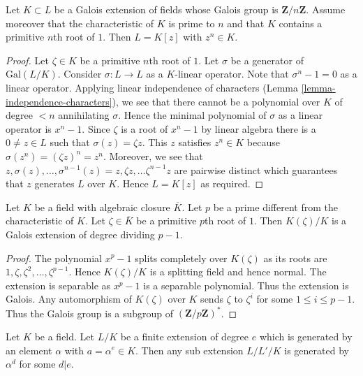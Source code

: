 \begin{lemma}
\label{lemma-Kummer}
Let $K \subset L$ be a Galois extension of fields whose Galois group is
$\mathbf{Z}/n\mathbf{Z}$. Assume moreover that the characteristic of $K$
is prime to $n$ and that $K$ contains a primitive $n$th root of $1$.
Then $L = K[z]$ with $z^n \in K$.
\end{lemma}

\begin{proof}
Let $\zeta \in K$ be a primitive $n$th root of $1$.
Let $\sigma$ be a generator of $\text{Gal}(L/K)$.
Consider $\sigma : L \to L$ as a $K$-linear operator.
Note that $\sigma^n - 1 = 0$ as a linear operator.
Applying linear independence of characters
(Lemma \ref{lemma-independence-characters}), we see
that there cannot be a polynomial over $K$ of degree $< n$
annihilating $\sigma$. Hence the minimal polynomial of $\sigma$
as a linear operator is $x^n - 1$. 
Since $\zeta$ is a root of $x^n - 1$ by linear algebra
there is a $0 \neq z \in L$ such that $\sigma(z) = \zeta z$.
This $z$ satisfies $z^n \in K$ because
$\sigma(z^n) = (\zeta z)^n = z^n$. Moreover, we see that
$z, \sigma(z), \ldots, \sigma^{n - 1}(z) =
z, \zeta z, \ldots \zeta^{n - 1} z$ are pairwise distinct
which guarantees that $z$ generates $L$ over $K$.
Hence $L = K[z]$ as required.
\end{proof}

\begin{lemma}
\label{lemma-adjoint-pth-root-unity}
Let $K$ be a field with algebraic closure $\overline{K}$.
Let $p$ be a prime different from the characteristic of $K$.
Let $\zeta \in \overline{K}$ be a primitive $p$th root
of $1$. Then $K(\zeta)/K$ is a Galois extension of degree dividing $p - 1$.
\end{lemma}

\begin{proof}
The polynomial $x^p - 1$ splits completely over
$K(\zeta)$ as its roots are $1, \zeta, \zeta^2, \ldots, \zeta^{p - 1}$.
Hence $K(\zeta)/K$ is a splitting field and hence normal.
The extension is separable as $x^p - 1$ is a separable polynomial.
Thus the extension is Galois. Any automorphism of $K(\zeta)$ over $K$
sends $\zeta$ to $\zeta^i$ for some $1 \leq i \leq p - 1$.
Thus the Galois group is a subgroup of $(\mathbf{Z}/p\mathbf{Z})^*$.
\end{proof}

\begin{lemma}
\label{lemma-subfields-kummer}
Let $K$ be a field. Let $L/K$ be a finite extension of degree $e$
which is generated by an element $\alpha$ with $a = \alpha^e \in K$.
Then any sub extension $L/L'/K$ is generated by $\alpha^d$ for some $d | e$.
\end{lemma}


